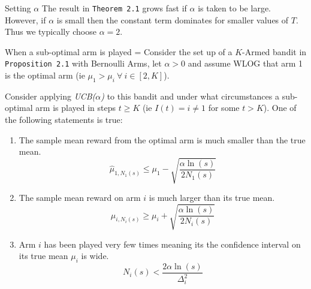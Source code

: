 \documentclass[11pt,a4paper]{article}
\begin{document}
  \begin{remark}{Setting $\alpha$}
    The result in \texttt{Theorem 2.1} grows fast if $\alpha$ is taken to be large. However, if $\alpha$ is small then the constant term dominates for smaller values of $T$. Thus we typically choose $\alpha=2$.
  \end{remark}

  \begin{theorem}{When a sub-optimal arm is played}
    \everymath={\displaystyle}
    Consider the set up of a $K$-Armed bandit in \texttt{Proposition 2.1} with Bernoulli Arms, let $\alpha>0$ and assume WLOG that arm 1 is the optimal arm (ie $\mu_1>\mu_i\ \forall\ i\in[2,K]$).
    \par Consider applying \textit{UCB($\alpha$)} to this bandit and under what circumstances a sub-optimal arm is played in steps $t\geq K$ (ie $I(t)=i\neq 1$ for some $t>K$). One of the following statements is true:
    \begin{enumerate}
      \item The sample mean reward from the optimal arm is much smaller than the true mean.
      \[ \hat\mu_{1,N_1(s)}\leq\mu_1-\sqrt{\frac{\alpha\ln(s)}{2N_1(s)}} \]
      \item The sample mean reward on arm $i$ is much larger than its true mean.
      \[ \hat\mu_{i,N_i(s)}\geq\mu_i+\sqrt{\frac{\alpha\ln(s)}{2N_i(s)}} \]
      \item Arm $i$ has been played very few times meaning its the confidence interval on its true mean $\mu_i$ is wide.
      \[ N_i(s)<\frac{2\alpha\ln(s)}{\Delta_i^2} \]
    \end{enumerate}
  \end{theorem}
\end{document}
